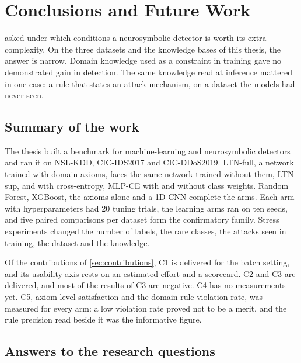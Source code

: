 \chapter{Conclusions and Future Work}
\label{ch:conclusions}

 asked under which conditions a neurosymbolic detector is worth its
extra complexity. On the three datasets and the knowledge bases of this thesis, the answer is
narrow. Domain knowledge used as a constraint in training gave no demonstrated gain in detection.
The same knowledge read at inference mattered in one case: a rule that states an attack mechanism,
on a dataset the models had never seen.

\section{Summary of the work}
\label{sec:conc-summary}

The thesis built a benchmark for machine-learning and neurosymbolic detectors and ran it on NSL-KDD,
CIC-IDS2017 and CIC-DDoS2019. LTN-full, a network trained with domain axioms, faces the same network
trained without them, LTN-sup, and with cross-entropy, MLP-CE with and without class weights. Random
Forest, XGBoost, the axioms alone and a 1D-CNN complete the arms. Each arm with hyperparameters had
20 tuning trials, the learning arms ran on ten seeds, and five paired comparisons per dataset form
the confirmatory family. Stress experiments changed the number of labels, the rare classes, the attacks seen
in training, the dataset and the knowledge.

Of the contributions of \cref{sec:contributions}, C1 is delivered for the batch setting, and its
usability axis rests on an estimated effort and a scorecard. C2 and C3 are delivered, and most
of the results of C3 are negative. C4 has no measurements yet. C5, axiom-level satisfaction and the
domain-rule violation rate, was measured for every arm: a low violation rate proved not to be a merit, and the rule precision read beside it was the informative
figure.

\section{Answers to the research questions}
\label{sec:conc-answers}

